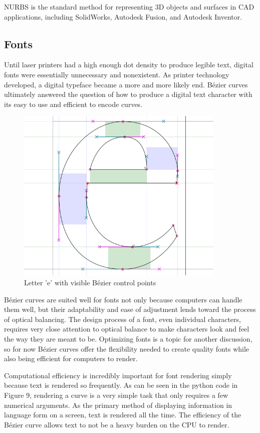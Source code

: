 \documentclass[12pt,letterpaper]{article}
\begin{document}

NURBS is the standard method for representing 3D objects and surfaces in CAD applications, including SolidWorks, Autodesk Fusion, and Autodesk Inventor. 

\subsection{Fonts}

Until laser printers had a high enough dot density to produce legible text, digital fonts were essentially unnecessary and nonexistent. As printer technology developed, a digital typeface became a more and more likely end. B\'ezier curves ultimately answered the question of how to produce a digital text character with its easy to use and efficient to encode curves.

\begin{figure}[H]
    \centering
    \includegraphics[width=10cm]{char}
    \caption{Letter 'e' with visible B\'ezier control points}
\end{figure}

B\'ezier curves are suited well for fonts not only because computers can handle them well, but their adaptability and ease of adjustment lends toward the process of optical balancing. The design process of a font, even individual characters, requires very close attention to optical balance to make characters look and feel the way they are meant to be. Optimizing fonts is a topic for another discussion, so for now B\'ezier curves offer the flexibility needed to create quality fonts while also being efficient for computers to render. 

Computational efficiency is incredibly important for font rendering simply because text is rendered so frequently. As can be seen in the python code in Figure 9, rendering a curve is a very simple task that only requires a few numerical arguments. As the primary method of displaying information in language form on a screen, text is rendered all the time. The efficiency of the B\'ezier curve allows text to not be a heavy burden on the CPU to render. 
\end{document}
